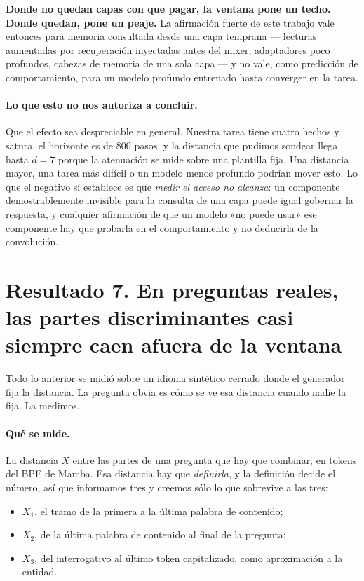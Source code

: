 \documentclass[11pt,a4paper]{article}
\begin{document}
\textbf{Donde no quedan capas con que pagar, la ventana pone un techo. Donde quedan, pone un peaje.}
La afirmación fuerte de este trabajo vale entonces para memoria consultada desde una capa temprana
--- lecturas aumentadas por recuperación inyectadas antes del mixer, adaptadores poco profundos,
cabezas de memoria de una sola capa --- y no vale, como predicción de comportamiento, para un modelo
profundo entrenado hasta converger en la tarea.

\paragraph{Lo que esto no nos autoriza a concluir.} Que el efecto sea despreciable en general. Nuestra
tarea tiene cuatro hechos y satura, el horizonte es de $800$ pasos, y la distancia que pudimos sondear
llega hasta $d{=}7$ porque la atenuación se mide sobre una plantilla fija. Una distancia mayor, una
tarea más difícil o un modelo menos profundo podrían mover esto. Lo que el negativo sí establece es
que \emph{medir el acceso no alcanza}: un componente demostrablemente invisible para la consulta de
una capa puede igual gobernar la respuesta, y cualquier afirmación de que un modelo «no puede usar»
ese componente hay que probarla en el comportamiento y no deducirla de la convolución.

\section{Resultado 7. En preguntas reales, las partes discriminantes casi siempre caen afuera de la ventana}

Todo lo anterior se midió sobre un idioma sintético cerrado donde el generador fija la distancia. La
pregunta obvia es cómo se ve esa distancia cuando nadie la fija. La medimos.

\paragraph{Qué se mide.} La distancia $X$ entre las partes de una pregunta que hay que combinar, en
tokens del BPE de Mamba. Esa distancia hay que \emph{definirla}, y la definición decide el número, así
que informamos tres y creemos sólo lo que sobrevive a las tres:

\begin{itemize}
\item $X_1$, el tramo de la primera a la última palabra de contenido;
\item $X_2$, de la última palabra de contenido al final de la pregunta;
\item $X_3$, del interrogativo al último token capitalizado, como aproximación a la entidad.
\end{itemize}
\end{document}
